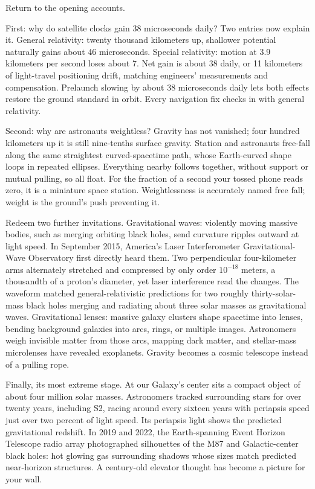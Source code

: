 
\begin{mainline}
Return to the opening accounts.

First: why do satellite clocks gain 38 microseconds daily? Two entries now explain it. General relativity: twenty thousand kilometers up, shallower potential naturally gains about 46 microseconds. Special relativity: motion at 3.9 kilometers per second loses about 7. Net gain is about 38 daily, or 11 kilometers of light-travel positioning drift, matching engineers' measurements and compensation. Prelaunch slowing by about 38 microseconds daily lets both effects restore the ground standard in orbit. Every navigation fix checks in with general relativity.

Second: why are astronauts weightless? Gravity has not vanished; four hundred kilometers up it is still nine-tenths surface gravity. Station and astronauts free-fall along the same straightest curved-spacetime path, whose Earth-curved shape loops in repeated ellipses. Everything nearby follows together, without support or mutual pulling, so all float. For the fraction of a second your tossed phone reads zero, it is a miniature space station. Weightlessness is accurately named free fall; weight is the ground's push preventing it.

Redeem two further invitations. Gravitational waves: violently moving massive bodies, such as merging orbiting black holes, send curvature ripples outward at light speed. In September 2015, America's Laser Interferometer Gravitational-Wave Observatory first directly heard them. Two perpendicular four-kilometer arms alternately stretched and compressed by only order \(10^{-18}\) meters, a thousandth of a proton's diameter, yet laser interference read the changes. The waveform matched general-relativistic predictions for two roughly thirty-solar-mass black holes merging and radiating about three solar masses as gravitational waves. Gravitational lenses: massive galaxy clusters shape spacetime into lenses, bending background galaxies into arcs, rings, or multiple images. Astronomers weigh invisible matter from those arcs, mapping dark matter, and stellar-mass microlenses have revealed exoplanets. Gravity becomes a cosmic telescope instead of a pulling rope.

Finally, its most extreme stage. At our Galaxy's center sits a compact object of about four million solar masses. Astronomers tracked surrounding stars for over twenty years, including S2, racing around every sixteen years with periapsis speed just over two percent of light speed. Its periapsis light shows the predicted gravitational redshift. In 2019 and 2022, the Earth-spanning Event Horizon Telescope radio array photographed silhouettes of the M87 and Galactic-center black holes: hot glowing gas surrounding shadows whose sizes match predicted near-horizon structures. A century-old elevator thought has become a picture for your wall.
\end{mainline}

